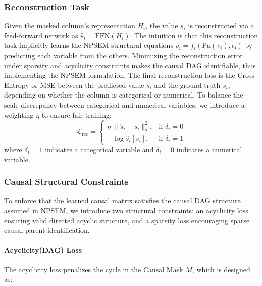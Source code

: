 \documentclass[sigconf, nonacm]{acmart}
\newcommand{\rl}[1]{{\color{black}#1}}
\newcommand{\sy}[1]{{\color{black}#1}}
\newcommand{\syend}[1]{{\color{black}#1}}
\newcommand{\syfix}[1]{{\color{black}#1}}
\newcommand{\syne}[1]{{\color{black}#1}}
\begin{document}
\subsubsection{Reconstruction Task}
Given the masked column's representation $H_i$, \syend{the value} $s_i$ is reconstructed via a feed-forward network \syend{as $\hat{s}_i = \text{FFN}(H_i)$.} 
\syfix{The intuition is that this reconstruction task implicitly learns the NPSEM structural equations $v_i = f_i(\mathrm{Pa}(v_i), \epsilon_i)$ by predicting each variable from the others. Minimizing the reconstruction error under sparsity and acyclicity constraints makes the causal DAG identifiable, thus implementing the NPSEM formulation.}
The final reconstruction loss is the Cross-Entropy or MSE between the predicted value $\hat{s}_i$ and the ground truth $s_i$, depending on whether the column is categorical or numerical. To balance the scale discrepancy between categorical and numerical variables, 
we introduce a weighting $\eta$ to ensure fair training:\syne{
\begin{equation}
    \mathcal{L}_{\text{rec}} =
    \begin{cases}
    \eta \cdot \|\hat{s}_i - s_i\|_2^2, & \text{if } \delta_i = 0 \\
    -\log \hat{s}_i[s_i], & \text{if } \delta_i = 1
    \end{cases}
    \label{eq:reconstruction-loss}
\end{equation}}
where $\delta_i=1$ indicates a categorical variable and $\delta_i=0$ indicates a numerical variable.

\subsubsection{Causal Structural Constraints}
\rl{To enforce that the learned causal matrix satisfies the causal DAG structure assumed in NPSEM, we introduce two structural constraints: an \sy{acyclicity loss} ensuring valid directed acyclic structure, and a sparsity loss encouraging sparse causal parent identification.}

\paragraph{Acyclicity(DAG) Loss}
The \sy{acyclicity loss} penalizes the cycle in the Causal Mask $M$, which is designed as:
\end{document}

